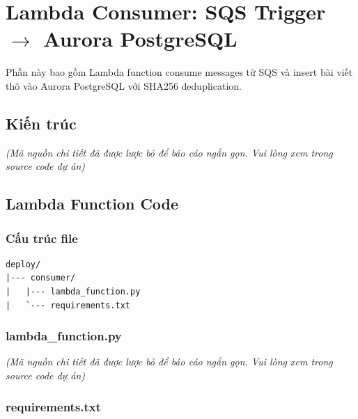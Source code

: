 \hypertarget{lambda-consumer-sqs-trigger-rightarrow-aurora-postgresql}{%
\section{\texorpdfstring{Lambda Consumer: SQS Trigger \(\rightarrow\)
Aurora
PostgreSQL}{Lambda Consumer: SQS Trigger \textbackslash rightarrow Aurora PostgreSQL}}}

Phần này bao gồm Lambda function consume messages từ SQS và insert bài
viết thô vào Aurora PostgreSQL với SHA256 deduplication.

\hypertarget{kiux1ebfn-truxfac}{%
\subsection{Kiến trúc}}

\emph{(Mã nguồn chi tiết đã được lược bỏ để báo cáo ngắn gọn. Vui lòng
xem trong source code dự án)}

\hypertarget{lambda-function-code}{%
\subsection{Lambda Function Code}}

\hypertarget{cux1ea5u-truxfac-file}{%
\subsubsection{Cấu trúc file}}

\begin{verbatim}
deploy/
|--- consumer/
|   |--- lambda_function.py
|   `--- requirements.txt
\end{verbatim}

\hypertarget{lambda_function.py}{%
\subsubsection{lambda\_function.py}}

\emph{(Mã nguồn chi tiết đã được lược bỏ để báo cáo ngắn gọn. Vui lòng
xem trong source code dự án)}

\hypertarget{requirements.txt}{%
\subsubsection{requirements.txt}}

\begin{Shaded}
\begin{Highlighting}[]
\end{Highlighting}
\end{Shaded}


